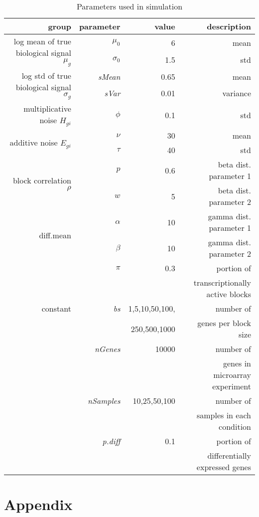 \documentclass[11pt]{article}
\begin{document}
\setcounter{table}{0}
\begin{table}[h]
\begin{tabular}{rrrr}
  \hline
\textbf{group} & \textbf{parameter} & \textbf{value} & \textbf{description}\\ \hline
\multirow{2}{*}{log mean of true biological signal $\mu_{g}$} & $\mu_0$ & 6 & mean\\
& $\sigma_0$ & 1.5 & std\\ \hline
\multirow{2}{*}{log std of true biological signal $\sigma_{g}$} & \textit{sMean} & 0.65 & mean\\
& \textit{sVar} & 0.01 & variance\\ \hline
multiplicative noise $H_{gi}$ & $\phi$ & 0.1 & std\\ \hline
\multirow{2}{*}{additive noise $E_{gi}$} & $\nu$ & 30 & mean\\
& $\tau$ & 40 & std\\ \hline

\multirow{2}{*}{block correlation $\rho$} & $p$ & 0.6 & beta dist. parameter 1\\
& $w$ & 5 & beta dist. parameter 2\\ \hline

\multirow{2}{*}{diff.mean} & $\alpha$ & 10 & gamma dist. parameter 1\\
& $\beta$ & 10 & gamma dist. parameter 2\\ \hline

\multirow{5}{*}{constant} & $\pi$ & 0.3 & portion of\\
& & & transcriptionally active blocks\\
& \textit{bs} & 1,5,10,50,100, & number of\\
& & 250,500,1000 & genes per block size\\
& \textit{nGenes} & 10000 & number of\\
& & & genes in microarray experiment\\
& \textit{nSamples} & 10,25,50,100 & number of\\
& & & samples in each condition\\
& \textit{p.diff} & 0.1 & portion of\\
& & & differentially expressed genes\\ \hline
\end{tabular}
\caption{Parameters used in simulation}
\label{tab:param}
\end{table}

\section{Appendix}
\end{document}

